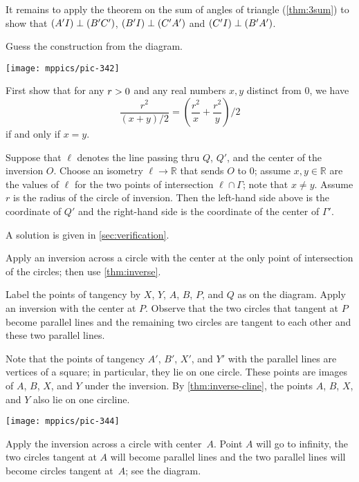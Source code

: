\begin{multicols}{2}
It remains to apply the theorem on the sum of angles of triangle (\ref{thm:3sum})
to show that $(A'I)\z\perp (B'C')$, 
$(B'I)\z\perp (C'A')$
and
$(C'I)\z\perp (B'A')$.

Guess the construction from the diagram.

\begin{Figure}
\vskip-0mm
\centering
\texttt{[image: mppics/pic-342]}
\end{Figure}

First show that for any $r\z>0$ and any real numbers $x,y$ distinct from $0$, we have
$$\frac{r^2}{(x+y)/2}
=
\left(\frac {r^2}x+\frac {r^2}y\right)/2$$
if and only if $x=y$.

Suppose that $\ell$ denotes the line passing thru $Q$, $Q'$, and the center of the inversion $O$.
Choose an isometry $\ell\to\mathbb{R}$ that sends $O$ to $0$;
assume $x,y\in \mathbb{R}$ are the values of $\ell$ for the two points of intersection $\ell\cap\Gamma$;
note that $x\ne y$.
Assume $r$ is the radius of the circle of inversion.
Then the left-hand side above is the coordinate of $Q'$ 
and the right-hand side is the coordinate of the center of $\Gamma'$.

A solution is given in \ref{sec:verification}.

Apply an inversion across a circle with the center at the only point of intersection of the circles;
then use \ref{thm:inverse}.

Label the points of tangency by $X$, $Y$, $A$, $B$, $P$, and $Q$ as on the diagram.
Apply an inversion with the center at $P$. 
Observe that the two circles that tangent at $P$ become parallel lines and 
the remaining two circles are tangent to each other and these two parallel lines.

Note that the points of tangency $A'$, $B'$, $X'$, and $Y'$ with the parallel lines are vertices of a square;
in particular, they lie on one circle.
These points are images of $A$, $B$, $X$, and $Y$ under the inversion.
By \ref{thm:inverse-cline}, the points $A$, $B$, $X$, and $Y$ also lie on one circline.

\begin{Figure}
\centering
\texttt{[image: mppics/pic-344]}
\end{Figure}

Apply the inversion across a circle with center~$A$. 
Point $A$ will go to infinity, the two circles tangent at $A$ will become parallel lines
and the two parallel lines will become circles tangent at~$A$; see the diagram.


\end{multicols}
